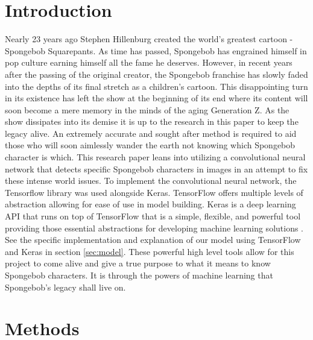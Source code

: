 \documentclass{article}
\begin{document}
\vskip 0.2in
\begin{multicols}{2}

\section{Introduction}
{\quad
Nearly 23 years ago Stephen Hillenburg created the world's greatest cartoon - Spongebob Squarepants. As time has passed, Spongebob has engrained himself in pop culture earning himself all the fame he deserves. However, in recent years after the passing of the original creator, the Spongebob franchise has slowly faded into the depths of its final stretch as a children's cartoon. This disappointing turn in its existence has left the show at the beginning of its end where its content will soon become a mere memory in the minds of the aging Generation Z. As the show dissipates into its demise it is up to the research in this paper to keep the legacy alive. An extremely accurate and sought after method is required to aid those who will soon aimlessly wander the earth not knowing which Spongebob character is which. This research paper leans into utilizing a convolutional neural network that detects specific Spongebob characters in images in an attempt to fix these intense world issues. 
\newline
\quad To implement the convolutional neural network, the Tensorflow library was used alongside Keras. TensorFlow offers multiple levels of abstraction allowing for ease of use in model building. Keras is a deep learning API that runs on top of TensorFlow that is a simple, flexible, and powerful tool providing those essential abstractions for developing machine learning solutions \cite{team_keras_nodate}. See the specific implementation and explanation of our model using TensorFlow and Keras in section \ref{sec:model}. These powerful high level tools allow for this project to come alive and give a true purpose to what it means to know Spongebob characters. It is through the powers of machine learning that Spongebob's legacy shall live on.
}
\vskip 0.2in

\section{Methods}
\label{sec:headings}


\end{multicols}
\end{document}
